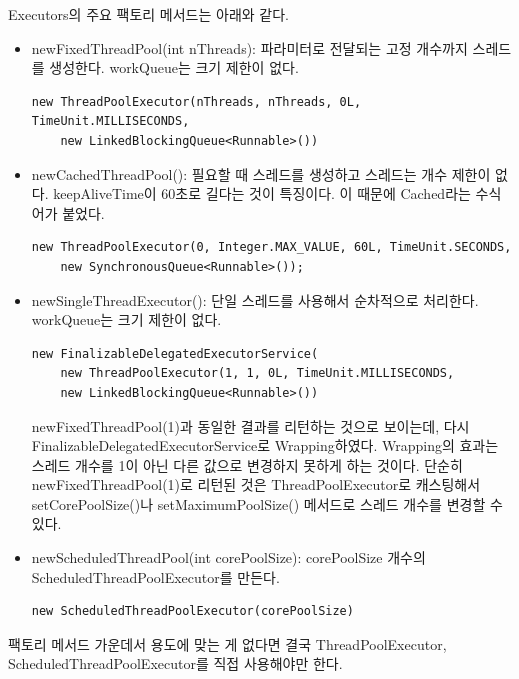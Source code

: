 Executors의 주요 팩토리 메서드는 아래와 같다.
\begin{itemize}

\item newFixedThreadPool(int nThreads): 파라미터로 전달되는 고정 개수까지 스레드를 생성한다. workQueue는 크기 제한이 없다.
\begin{lstlisting}[frame=single] 
new ThreadPoolExecutor(nThreads, nThreads, 0L, TimeUnit.MILLISECONDS, 
    new LinkedBlockingQueue<Runnable>())
\end{lstlisting}

\item newCachedThreadPool(): 필요할 때 스레드를 생성하고 스레드는 개수 제한이 없다. keepAliveTime이 60초로 길다는 것이 특징이다. 이 때문에 Cached라는 수식어가 붙었다.
\begin{lstlisting}[frame=single] 
new ThreadPoolExecutor(0, Integer.MAX_VALUE, 60L, TimeUnit.SECONDS, 
    new SynchronousQueue<Runnable>());
\end{lstlisting}

\item newSingleThreadExecutor(): 단일 스레드를 사용해서 순차적으로 처리한다. workQueue는 크기 제한이 없다. 
\begin{lstlisting}[frame=single] 
new FinalizableDelegatedExecutorService(
	new ThreadPoolExecutor(1, 1, 0L, TimeUnit.MILLISECONDS, 
	new LinkedBlockingQueue<Runnable>())
\end{lstlisting}
newFixedThreadPool(1)과 동일한 결과를 리턴하는 것으로 보이는데, 다시 FinalizableDelegatedExecutorService로 Wrapping하였다. Wrapping의 효과는 스레드 개수를 1이 아닌 다른 값으로 변경하지 못하게 하는 것이다. 단순히 newFixedThreadPool(1)로 리턴된 것은 ThreadPoolExecutor로 캐스팅해서 setCorePoolSize()나 setMaximumPoolSize() 메서드로 스레드 개수를 변경할 수 있다.

\item newScheduledThreadPool(int corePoolSize): corePoolSize 개수의 ScheduledThreadPoolExecutor를 만든다.
\begin{lstlisting}[frame=single] 
new ScheduledThreadPoolExecutor(corePoolSize)
\end{lstlisting}

\end{itemize}

팩토리 메서드 가운데서 용도에 맞는 게 없다면 결국 ThreadPoolExecutor, ScheduledThreadPoolExecutor를 직접 사용해야만 한다.\\

